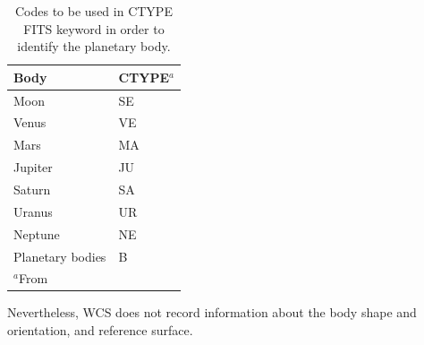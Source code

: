 \begin{table}
\label{table:ctype}
\caption{Codes to be used in CTYPE FITS keyword in order to identify the planetary body.}
\centering
\begin{tabular}{l l}
\hline
Body & CTYPE$^{a}$ \\ 
\hline
Moon & SE \\
Venus & VE \\
Mars & MA \\
Jupiter & JU \\
Saturn & SA \\
Uranus & UR \\
Neptune & NE \\
Planetary bodies & B \\
\hline
\multicolumn{2}{l}{$^{a}$From \citet{calagreisenI}}
\end{tabular}
\end{table}

Nevertheless, WCS does not record information about the body shape and
orientation, and reference surface.

